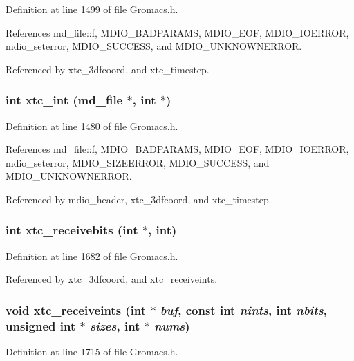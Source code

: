 Definition at line 1499 of file Gromacs.h.

References md\_\-file::f, MDIO\_\-BADPARAMS, MDIO\_\-EOF, MDIO\_\-IOERROR, mdio\_\-seterror, MDIO\_\-SUCCESS, and MDIO\_\-UNKNOWNERROR.

Referenced by xtc\_\-3dfcoord, and xtc\_\-timestep.
\subsubsection{\setlength{\rightskip}{0pt plus 5cm}int xtc\_\-int ({\bf md\_\-file} $\ast$, int $\ast$)\hspace{0.3cm}{\tt  [static]}}\label{Gromacs_8h_a53}




Definition at line 1480 of file Gromacs.h.

References md\_\-file::f, MDIO\_\-BADPARAMS, MDIO\_\-EOF, MDIO\_\-IOERROR, mdio\_\-seterror, MDIO\_\-SIZEERROR, MDIO\_\-SUCCESS, and MDIO\_\-UNKNOWNERROR.

Referenced by mdio\_\-header, xtc\_\-3dfcoord, and xtc\_\-timestep.
\subsubsection{\setlength{\rightskip}{0pt plus 5cm}int xtc\_\-receivebits (int $\ast$, int)\hspace{0.3cm}{\tt  [static]}}\label{Gromacs_8h_a64}




Definition at line 1682 of file Gromacs.h.

Referenced by xtc\_\-3dfcoord, and xtc\_\-receiveints.
\subsubsection{\setlength{\rightskip}{0pt plus 5cm}void xtc\_\-receiveints (int $\ast$ {\em buf}, const int {\em nints}, int {\em nbits}, unsigned int $\ast$ {\em sizes}, int $\ast$ {\em nums})\hspace{0.3cm}{\tt  [static]}}\label{Gromacs_8h_a72}




Definition at line 1715 of file Gromacs.h.

